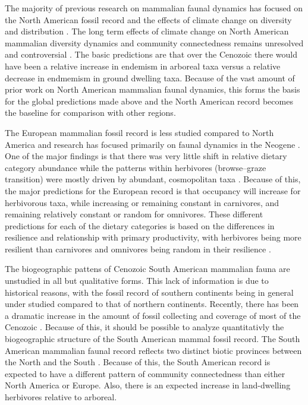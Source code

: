 \documentclass[12pt,letterpaper]{article}
\begin{document}
The majority of previous research on mammalian faunal dynamics has focused on the North American fossil record and the effects of climate change on diversity and distribution \citep{Alroy2000g,Alroy1996a,Alroy1998,Barnosky2001a,Simpson1944,Simpson1953,Badgley2013,Blois2009,Figueirido2012,Gunnell1995,Hadly2001}. The long term effects of climate change on North American mammalian diversity dynamics and community connectedness remains unresolved and controversial \citep{Alroy2000g,Blois2009,Figueirido2012,Barnosky2001a}. The basic predictions are that over the Cenozoic there would have been a relative increase in endemism in arboreal taxa versus a relative decrease in endmemism in ground dwelling taxa. Because of the vast amount of prior work on North American mammalian faunal dynamics, this forms the basis for the global predictions made above and the North American record becomes the baseline for comparison with other regions.

The European mammalian fossil record is less studied compared to North America and research has focused primarily on faunal dynamics in the Neogene \citep{Jernvall2002,Jernvall2004,Liow2008,Raia2006,Raia2005,Raia2011c}. One of the major findings is that there was very little shift in relative dietary category abundance \citep{Jernvall2004} while the patterns within herbivores (browse--graze transition) were mostly driven by abundant, cosmopolitan taxa \citep{Jernvall2002}. Because of this, the major predictions for the European record is that occupancy will increase for herbivorous taxa, while increasing or remaining constant in carnivores, and remaining relatively constant or random for omnivores. These different predictions for each of the dietary categories is based on the differences in resilience and relationship with primary productivity, with herbivores being more resilient than carnivores and omnivores being random in their resilience \citep{Jernvall2004}. 

The biogeographic pattens of Cenozoic South American mammalian fauna are unstudied in all but qualitative forms. This lack of information is due to historical reasons, with the fossil record of southern continents being in general under studied compared to that of northern continents. Recently, there has been a dramatic increase in the amount of fossil collecting and coverage of most of the Cenozoic \citep{Macfadden1997,Macfadden2006,Flynn1998a}. Because of this, it should be possible to analyze quantitativly the biogeographic structure of the South American mammal fossil record. The South American mammalian faunal record reflects two distinct biotic provinces between the North and the South \citep{Macfadden1997,Macfadden2006,Flynn1998a,Patterson1968}. Because of this, the South American record is expected to have a different pattern of community connectedness than either North America or Europe. Also, there is an expected increase in land-dwelling herbivores relative to arboreal.
\end{document}
